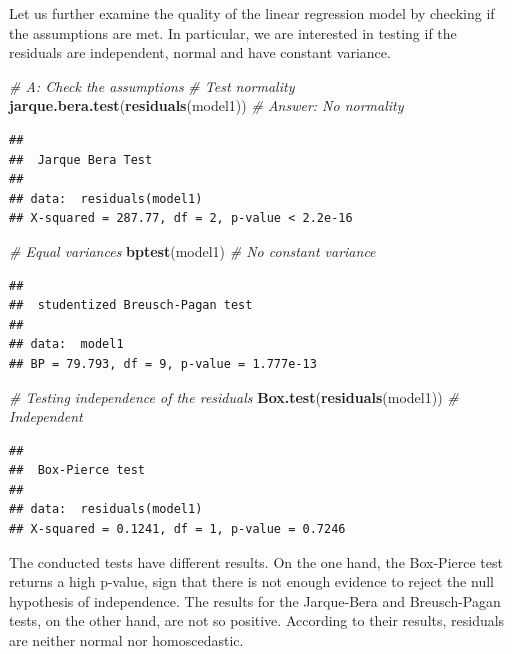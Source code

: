 \documentclass[12pt,]{article}
\newenvironment{Shaded}{\begin{snugshade}}{\end{snugshade}}
\newcommand{\KeywordTok}[1]{\textcolor[rgb]{0.13,0.29,0.53}{\textbf{{#1}}}}
\newcommand{\CommentTok}[1]{\textcolor[rgb]{0.56,0.35,0.01}{\textit{{#1}}}}
\newcommand{\NormalTok}[1]{{#1}}
\begin{document}
Let us further examine the quality of the linear regression model by
checking if the assumptions are met. In particular, we are interested in
testing if the residuals are independent, normal and have constant
variance.

\begin{Shaded}
\begin{Highlighting}[]
\CommentTok{# A: Check the assumptions}
\CommentTok{# Test normality}
\KeywordTok{jarque.bera.test}\NormalTok{(}\KeywordTok{residuals}\NormalTok{(model1)) }\CommentTok{# Answer: No normality}
\end{Highlighting}
\end{Shaded}

\begin{verbatim}
## 
##  Jarque Bera Test
## 
## data:  residuals(model1)
## X-squared = 287.77, df = 2, p-value < 2.2e-16
\end{verbatim}

\begin{Shaded}
\begin{Highlighting}[]
\CommentTok{# Equal variances}
\KeywordTok{bptest}\NormalTok{(model1) }\CommentTok{# No constant variance}
\end{Highlighting}
\end{Shaded}

\begin{verbatim}
## 
##  studentized Breusch-Pagan test
## 
## data:  model1
## BP = 79.793, df = 9, p-value = 1.777e-13
\end{verbatim}

\begin{Shaded}
\begin{Highlighting}[]
\CommentTok{# Testing independence of the residuals}
\KeywordTok{Box.test}\NormalTok{(}\KeywordTok{residuals}\NormalTok{(model1)) }\CommentTok{# Independent}
\end{Highlighting}
\end{Shaded}

\begin{verbatim}
## 
##  Box-Pierce test
## 
## data:  residuals(model1)
## X-squared = 0.1241, df = 1, p-value = 0.7246
\end{verbatim}

The conducted tests have different results. On the one hand, the
Box-Pierce test returns a high p-value, sign that there is not enough
evidence to reject the null hypothesis of independence. The results for
the Jarque-Bera and Breusch-Pagan tests, on the other hand, are not so
positive. According to their results, residuals are neither normal nor
homoscedastic.
\end{document}

